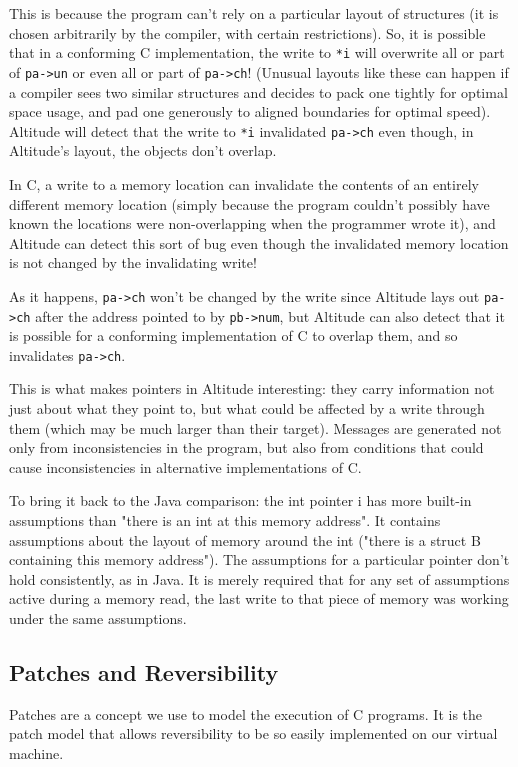 \documentclass[10pt,a4paper]{report}
\begin{document}
This is because the program can't rely on a particular layout of structures (it is chosen arbitrarily by the compiler, with certain restrictions). So, it is possible that in a conforming C implementation, the write to \lstinline{*i} will overwrite all or part of \lstinline{pa->un} or even all or part of \lstinline{pa->ch}! (Unusual layouts like these can happen if a compiler sees two similar structures and decides to pack one tightly for optimal space usage, and pad one generously to aligned boundaries for optimal speed). Altitude will detect that the write to \lstinline{*i} invalidated \lstinline{pa->ch} even though, in Altitude's layout, the objects don't overlap.

In C, a write to a memory location can invalidate the contents of an entirely different memory location (simply because the program couldn't possibly have known the locations were non-overlapping when the programmer wrote it), and Altitude can detect this sort of bug even though the invalidated memory location is not changed by the invalidating write!

As it happens, \lstinline{pa->ch} won't be changed by the write since Altitude lays out \lstinline{pa->ch} after the address pointed to by \lstinline{pb->num}, but Altitude can also detect that it is possible for a conforming implementation of C to overlap them, and so invalidates \lstinline{pa->ch}.

This is what makes pointers in Altitude interesting: they carry information not just about what they point to, but what could be affected by a write through them (which may be much larger than their target). Messages are generated not only from inconsistencies in the program, but also from conditions that could cause inconsistencies in alternative implementations of C.

To bring it back to the Java comparison: the int pointer i has more built-in assumptions than "there is an int at this memory address". It contains assumptions about the layout of memory around the int ("there is a struct B containing this memory address"). The assumptions for a particular pointer don't hold consistently, as in Java. It is merely required that for any set of assumptions active during a memory read, the last write to that piece of memory was working under the same assumptions.

\subsection{Patches and Reversibility}
Patches are a concept we use to model the execution of C programs. It is the patch model that allows reversibility to be so easily implemented on our virtual machine.
\end{document}
